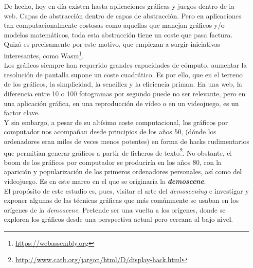 De hecho, hoy en día existen hasta aplicaciones gráficas y juegos dentro de la web. Capas de abstracción dentro de capas de abstracción. Pero en aplicaciones tan computacionalmente costosas como aquellas que manejan gráficos y/o modelos matemáticos, toda esta abstracción tiene un coste que pasa factura. Quizá es precisamente por este motivo, que empiezan a surgir iniciativas interesantes, como Wasm\footnote{\url{https://webassembly.org}}.\\

Los gráficos siempre han requerido grandes capacidades de cómputo, aumentar la resolución de pantalla supone un coste cuadrático. Es por ello, que en el terreno de los gráficos, la simplicidad, la sencillez y la eficiencia priman. En una web, la diferencia entre 10 o 100 fotogramas por segundo puede no ser relevante, pero en una aplicación gráfica, en una reproducción de vídeo o en un videojuego, es un factor clave.\\

Y sin embargo, a pesar de su altísimo coste computacional, los gráficos por computador nos acompañan desde principios de los años 50, (dónde los ordenadores eran miles de veces menos potentes) en forma de hacks rudimentarios que permitían generar gráficos a partir de ficheros de texto\footnote{\url{http://www.catb.org/jargon/html/D/display-hack.html}}. No obstante, el boom de los gráficos por computador se produciría en los años 80, con la aparición y popularización de los primeros ordenadores personales, así como del videojuego. Es en este marco en el que se originaría la \textbf{\emph{demoscene}}.\\

El propósito de este estudio es, pues, visitar el arte del \emph{demoscening} e investigar y exponer algunas de las técnicas gráficas que más comúnmente se usaban en los orígenes de la \emph{demoscene}. Pretende ser una vuelta a los orígenes, donde se exploren los gráficos desde una perspectiva actual pero cercana al bajo nivel. 